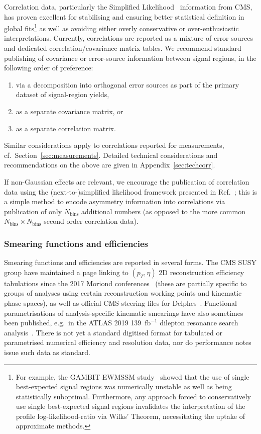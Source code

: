 \documentclass[a4paper,aps,prd,longbibliography,notitlepage,showpacs,amsmath,amssymb,superscriptaddress,nofootinbib,floatfix,11pt,preprintnumbers]{revtex4-1-mod}
\newcommand{\gambit}{\textsf{GAMBIT}\xspace}
\newcommand{\delphes}{\textsf{Delphes}\xspace}
\newcommand{\eg}{e.g.\xspace}
\begin{document}
Correlation data, particularly the Simplified Likelihood~\cite{CMS:2242860} information from CMS, has proven excellent for stabilising and ensuring better statistical definition in global fits\footnote{For example, the \gambit EWMSSM study~\cite{GAMBIT:EWMSSM} showed that the use of single best-expected signal regions was numerically unstable as well as being statistically suboptimal. Furthermore, any approach forced to conservatively use single best-expected signal regions invalidates the interpretation of the profile log-likelihood-ratio via Wilks' Theorem, necessitating the uptake of approximate methods.} as well as avoiding either overly conservative or over-enthusiastic interpretations.
Currently, correlations are reported as a mixture of error sources and dedicated correlation/covariance matrix tables.
We recommend standard publishing of covariance or error-source information between signal regions, in the following order of preference:
\begin{enumerate}
\item via a decomposition into orthogonal error sources as part of the primary dataset of signal-region yields,
\item as a separate covariance matrix, or
\item as a separate correlation matrix.
\end{enumerate}
Similar considerations apply to correlations reported for measurements, cf.~Section~\ref{sec:measurements}.
Detailed technical considerations and recommendations on the above  are given in Appendix~\ref{sec:techcorr}.

If non-Gaussian effects are relevant, we encourage the publication of correlation data
using the (next-to-)simplified likelihood framework presented in Ref.~\cite{Buckley:2018vdr}; this is a simple method to encode asymmetry information into correlations via publication of only $N_\text{bins}$ additional numbers (as opposed to the more common $N_\text{bins} \times N_\text{bins}$ second order correlation data).


\subsubsection{Smearing functions and efficiencies}

Smearing functions and efficiencies
are reported in several forms.  The CMS SUSY group have maintained a page linking to $(p_T, \eta)$ 2D reconstruction efficiency tabulations since the 2017 Moriond conferences~\cite{cmsMoriondEffs} (these are partially specific to groups of analyses using certain reconstruction working points and kinematic phase-spaces), as well as official CMS steering files for \delphes~\cite{deFavereau:2013fsa}. Functional parametrisations of analysis-specific kinematic smearings have also sometimes been published, \eg~in the ATLAS 2019 139~$\text{fb}^{-1}$ dilepton resonance search analysis~\cite{Aad:2019fac}. There is not yet a standard digitised format for tabulated or parametrised numerical efficiency and resolution data, nor do performance notes issue such data as standard.
\end{document}
